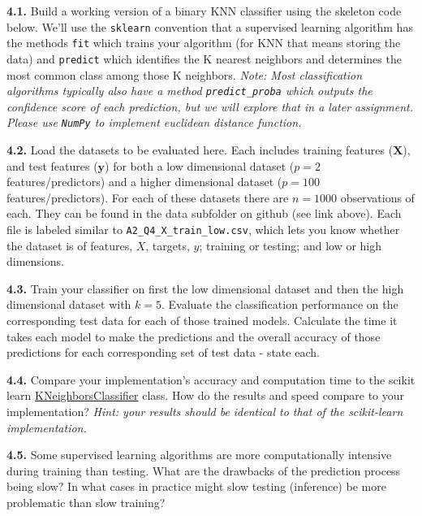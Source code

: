 \documentclass[
  letterpaper,
  DIV=11,
  numbers=noendperiod]{scrartcl}
\begin{document}
\textbf{4.1.} Build a working version of a binary KNN classifier using
the skeleton code below. We'll use the \texttt{sklearn} convention that
a supervised learning algorithm has the methods \texttt{fit} which
trains your algorithm (for KNN that means storing the data) and
\texttt{predict} which identifies the K nearest neighbors and determines
the most common class among those K neighbors. \emph{Note: Most
classification algorithms typically also have a method
\texttt{predict\_proba} which outputs the confidence score of each
prediction, but we will explore that in a later assignment. Please use
\texttt{NumPy} to implement euclidean distance function.}

\textbf{4.2.} Load the datasets to be evaluated here. Each includes
training features (\(\mathbf{X}\)), and test features (\(\mathbf{y}\))
for both a low dimensional dataset (\(p = 2\) features/predictors) and a
higher dimensional dataset (\(p = 100\) features/predictors). For each
of these datasets there are \(n=1000\) observations of each. They can be
found in the data subfolder on github (see link above). Each file is
labeled similar to \texttt{A2\_Q4\_X\_train\_low.csv}, which lets you
know whether the dataset is of features, \(X\), targets, \(y\); training
or testing; and low or high dimensions.

\textbf{4.3.} Train your classifier on first the low dimensional dataset
and then the high dimensional dataset with \(k=5\). Evaluate the
classification performance on the corresponding test data for each of
those trained models. Calculate the time it takes each model to make the
predictions and the overall accuracy of those predictions for each
corresponding set of test data - state each.

\textbf{4.4.} Compare your implementation's accuracy and computation
time to the scikit learn
\href{http://scikit-learn.org/stable/modules/generated/sklearn.neighbors.KNeighborsClassifier.html}{KNeighborsClassifier}
class. How do the results and speed compare to your implementation?
\emph{Hint: your results should be identical to that of the scikit-learn
implementation.}

\textbf{4.5.} Some supervised learning algorithms are more
computationally intensive during training than testing. What are the
drawbacks of the prediction process being slow? In what cases in
practice might slow testing (inference) be more problematic than slow
training?
\end{document}
